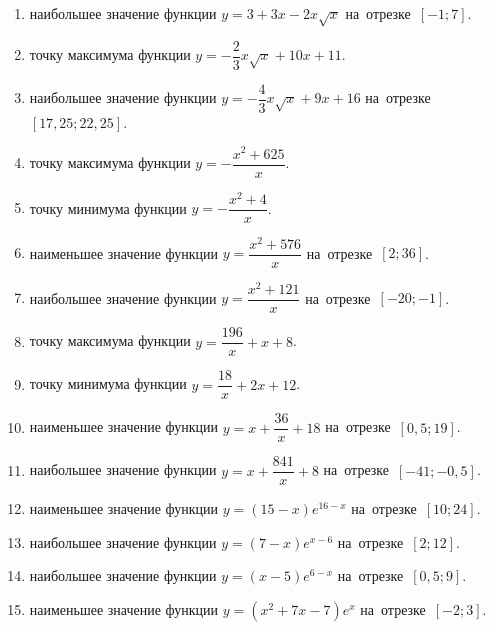 \documentclass[a4paper,10pt]{article}
\begin{document}
\begin{enumerate}
\item {} наибольшее значение функции $y=3+3x -2x\sqrt{x}$ на~отрезке~$\left[-1;7\right]$.

\item {} точку максимума функции $y=-\dfrac{2}{3}x\sqrt{x} +10x+11$.

\item {} наибольшее значение функции $y=-\dfrac{4}{3}x\sqrt{x} +9x+16$ на~отрезке~$\left[17,25;22,25\right]$.

\item {} точку максимума функции $y=-\dfrac{x^2 +625}{x}$.

\item {} точку минимума функции $y=-\dfrac{x^2 +4}{x}$.

\item {} наименьшее значение функции $y=\dfrac{x^2 +576}{x}$ на~отрезке~$\left[2;36\right]$.

\item {} наибольшее значение функции $y=\dfrac{x^2 +121}{x}$ на~отрезке~$\left[-20;-1\right]$.

\item {} точку максимума функции $y=\dfrac{196}{x} +x+8$.

\item {} точку минимума функции $y=\dfrac{18}{x} +2x+12$.

\item {} наименьшее значение функции $y=x+\dfrac{36}{x} +18$ на~отрезке~$\left[0,5;19\right]$.

\item {} наибольшее значение функции $y=x+\dfrac{841}{x} +8$ на~отрезке~$\left[-41;-0,5\right]$.

\item {} наименьшее значение функции $y=\left(15-x\right)e^{16-x}$ на~отрезке~$\left[10;24\right]$.

\item {} наибольшее значение функции $y=\left(7-x\right)e^{x-6}$ на~отрезке~$\left[2;12\right]$.

\item {} наибольшее значение функции $y=\left(x-5\right)e^{6-x}$ на~отрезке~$\left[0,5;9\right]$.

\item {} наименьшее значение функции $y=\left(x^2 +7x -7\right)e^{x }$ на~отрезке~$\left[-2;3\right]$.


\end{enumerate}
\end{document}
